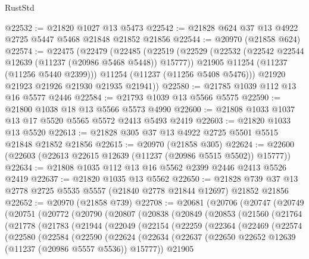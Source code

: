 \begin{lexlean}{RustStd}
\begin{coremodule}
@22532 := @21820 @1027 @13 @5473
@22542 := @21828 @624 @37 @13 @4922 @2725 @5447 @5468 @21848 @21852 @21856
@22544 := @20970 (@21858 @624)
@22574 := @22475
    (@22479
      (@22485
        (@22519
          (@22529
            (@22532 (@22542 @22544 @12639 (@11237 (@20986 @5468 @5448)) @15777))
            @21905
            @11254
            (@11237 (@11256 @5440 @2399)))
          @11254
          (@11237 (@11256 @5408 @5476)))
        @21920
        @21923
        @21926
        @21930
        @21935
        @21941))
@22580 := @21785 @1039 @112 @13 @16 @5577 @2446
@22584 := @21793 @1039 @13 @5566 @5575
@22590 := @21800 @1038 @18 @13 @5566 @5573 @4990
@22600 := @21808 @1033 @1037 @13 @17 @5520 @5565 @5572 @2413 @5493 @2419
@22603 := @21820 @1033 @13 @5520
@22613 := @21828 @305 @37 @13 @4922 @2725 @5501 @5515 @21848 @21852 @21856
@22615 := @20970 (@21858 @305)
@22624 := @22600 (@22603 (@22613 @22615 @12639 (@11237 (@20986 @5515 @5502)) @15777))
@22634 := @21808 @1035 @112 @13 @16 @5562 @2399 @2446 @2413 @5526 @2419
@22637 := @21820 @1035 @13 @5562
@22650 := @21828 @739 @37 @13 @2778 @2725 @5535 @5557 (@21840 @2778 @21844 @12697) @21852 @21856
@22652 := @20970 (@21858 @739)
@22708 := @20681
    (@20706
      (@20747
        (@20749
          (@20751
            (@20772
              (@20790
                (@20807
                  (@20838
                    (@20849
                      (@20853
                        (@21560
                          (@21764
                            (@21778
                              (@21783
                                (@21944
                                  (@22049
                                    (@22154
                                      (@22259
                                        (@22364
                                          (@22469
                                            (@22574
                                              (@22580
                                                (@22584
                                                  (@22590
                                                    (@22624
                                                      (@22634
                                                        (@22637
                                                          (@22650
                                                            @22652
                                                            @12639
                                                            (@11237 (@20986 @5557 @5536))
                                                            @15777))
                                                        @21905

\end{coremodule}
\end{lexlean}
